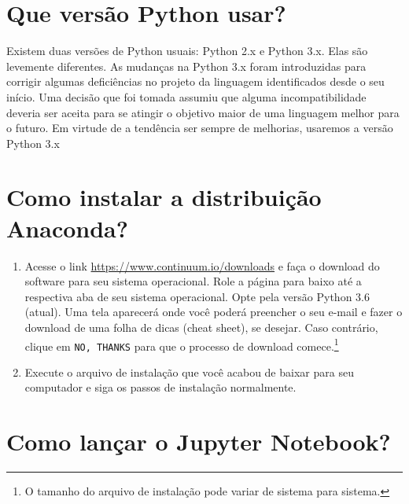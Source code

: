 \documentclass[a4paper,12pt]{article}
\begin{document}
\section*{Que versão Python usar?}

Existem duas versões de Python usuais: Python 2.x e Python 3.x. Elas são
levemente diferentes. As mudanças na Python 3.x foram introduzidas para
corrigir algumas deficiências no projeto da linguagem identificados
desde o seu início. Uma decisão que foi tomada assumiu que alguma
incompatibilidade deveria ser aceita para se atingir o objetivo maior de
uma linguagem melhor para o futuro. Em virtude de a tendência ser sempre
de melhorias, usaremos a versão Python 3.x

\section*{Como instalar a distribuição Anaconda?}

\begin{enumerate}
\item
  Acesse o link \url{https://www.continuum.io/downloads} e faça o
  download do software para seu sistema operacional. Role a página para
  baixo até a respectiva aba de seu sistema operacional. Opte pela
  versão Python 3.6 (atual). Uma tela aparecerá onde você poderá
  preencher o seu e-mail e fazer o download de uma folha de dicas (cheat
  sheet), se desejar. Caso contrário, clique em \texttt{NO,\ THANKS}
  para que o processo de download
  comece.\footnote{O tamanho do arquivo de instalação pode variar de sistema para sistema.}
\item
  Execute o arquivo de instalação que você acabou de baixar para seu
  computador e siga os passos de instalação normalmente.
\end{enumerate}

\section*{Como lançar o Jupyter Notebook?}
\end{document}
